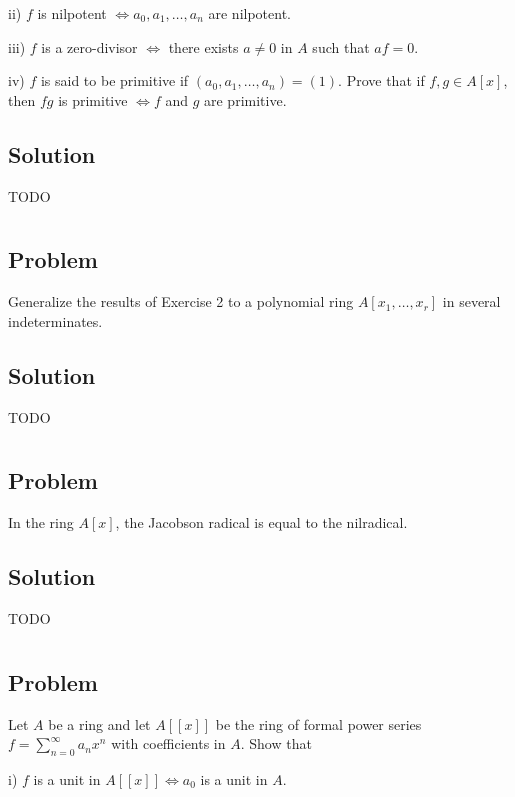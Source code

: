 \documentclass[book,12pt,oneside,openany]{memoir}
\begin{document}
ii) $f$ is nilpotent $\Leftrightarrow a_0, a_1, \ldots, a_n$ are nilpotent.

iii) $f$ is a zero-divisor $\Leftrightarrow$ there exists $a \neq 0$ in $A$ such that $af = 0$.

iv) $f$ is said to be primitive if $(a_0, a_1, \ldots, a_n) = (1)$. Prove that if $f,g \in A[x]$, then $fg$ is primitive $\Leftrightarrow f$ and $g$ are primitive.

\subsection{Solution}
TODO

\section{}
\subsection{Problem}
Generalize the results of Exercise 2 to a polynomial ring $A[x_1, \ldots, x_r]$ in several indeterminates.

\subsection{Solution}
TODO
\section{}
\subsection{Problem}
In the ring $A[x]$, the Jacobson radical is equal to the nilradical.

\subsection{Solution}
TODO

\section{}
\subsection{Problem}
Let $A$ be a ring and let $A[[x]]$ be the ring of formal power series $f = \sum_{n=0}^{\infty} a_n x^n$ with coefficients in $A$. Show that 

i) $f$ is a unit in $A[[x]] \Leftrightarrow a_0$ is a unit in $A$.
\end{document}
